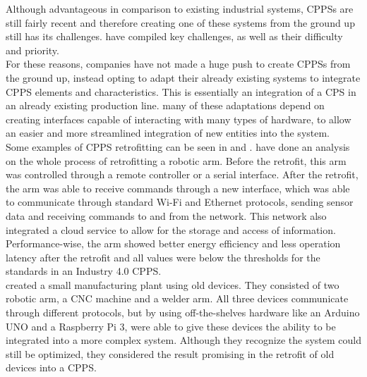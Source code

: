 Although advantageous in comparison to existing industrial systems, \gls{CPPS}s are still fairly recent and therefore creating one of these systems from the ground up still has its challenges. \citeauthor{LEITAO201611} \cite{LEITAO201611} have compiled key challenges, as well as their difficulty and priority.\\

For these reasons, companies have not made a huge push to create \gls{CPPS}s from the ground up, instead opting to adapt their already existing systems to integrate \gls{CPPS} elements and characteristics. This is essentially an integration of a \gls{CPS} in an already existing production line. many of these adaptations depend on creating interfaces capable of interacting with many types of hardware, to allow an easier and more streamlined integration of new entities into the system.\\

Some examples of \gls{CPPS} retrofitting can be seen in \citeauthor{CARDIN201911} \cite{CARDIN201911} and \citeauthor{8328326} \cite{8328326}. \citeauthor{CARDIN201911} \cite{CARDIN201911} have done an analysis on the whole process of retrofitting a robotic arm. Before the retrofit, this arm was controlled through a remote controller or a serial interface. After the retrofit, the arm was able to receive commands through a new interface, which was able to communicate through standard Wi-Fi and Ethernet protocols, sending sensor data and receiving commands to and from the network. This network also integrated a cloud service to allow for the storage and access of information. Performance-wise, the arm showed better energy efficiency and less operation latency after the retrofit and all values were below the thresholds for the standards in an Industry 4.0 \gls{CPPS}.\\

\citeauthor{8328326} \cite{8328326} created a small manufacturing plant using old devices. They consisted of two robotic arm, a CNC machine and a welder arm. All three devices communicate through different protocols, but by using off-the-shelves hardware like an Arduino UNO and a Raspberry Pi 3, \citeauthor{8328326} were able to give these devices the ability to be integrated into a more complex system. Although they recognize the system could still be optimized, they considered the result promising in the retrofit of old devices into a \gls{CPPS}.


